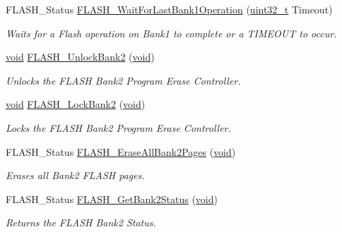 \begin{DoxyCompactItemize}
F\-L\-A\-S\-H\-\_\-\-Status \hyperlink{group___f_l_a_s_h___exported___functions_ga470d345c2ea4304f899aa988bdd23824}{F\-L\-A\-S\-H\-\_\-\-Wait\-For\-Last\-Bank1\-Operation} (\hyperlink{stdint_8h_a435d1572bf3f880d55459d9805097f62}{uint32\-\_\-t} Timeout)
\begin{DoxyCompactList}\small\item\em Waits for a Flash operation on Bank1 to complete or a T\-I\-M\-E\-O\-U\-T to occur. \end{DoxyCompactList}\item 
\hyperlink{group___n_a_m_e_ga18028b8badbf1ea7e704ccac3c488e82}{void} \hyperlink{group___f_l_a_s_h___exported___functions_gadb7b6d3f2dc0cd6153a58a507e123e0e}{F\-L\-A\-S\-H\-\_\-\-Unlock\-Bank2} (\hyperlink{group___n_a_m_e_ga18028b8badbf1ea7e704ccac3c488e82}{void})
\begin{DoxyCompactList}\small\item\em Unlocks the F\-L\-A\-S\-H Bank2 Program Erase Controller. \end{DoxyCompactList}\item 
\hyperlink{group___n_a_m_e_ga18028b8badbf1ea7e704ccac3c488e82}{void} \hyperlink{group___f_l_a_s_h___exported___functions_ga592519cb66d78b0eda7219063de8a163}{F\-L\-A\-S\-H\-\_\-\-Lock\-Bank2} (\hyperlink{group___n_a_m_e_ga18028b8badbf1ea7e704ccac3c488e82}{void})
\begin{DoxyCompactList}\small\item\em Locks the F\-L\-A\-S\-H Bank2 Program Erase Controller. \end{DoxyCompactList}\item 
F\-L\-A\-S\-H\-\_\-\-Status \hyperlink{group___f_l_a_s_h___exported___functions_gad1ac52213328ae0c9ec08666baa7b904}{F\-L\-A\-S\-H\-\_\-\-Erase\-All\-Bank2\-Pages} (\hyperlink{group___n_a_m_e_ga18028b8badbf1ea7e704ccac3c488e82}{void})
\begin{DoxyCompactList}\small\item\em Erases all Bank2 F\-L\-A\-S\-H pages. \end{DoxyCompactList}\item 
F\-L\-A\-S\-H\-\_\-\-Status \hyperlink{group___f_l_a_s_h___exported___functions_ga53c01fc72f37e0d5610f35337a2da110}{F\-L\-A\-S\-H\-\_\-\-Get\-Bank2\-Status} (\hyperlink{group___n_a_m_e_ga18028b8badbf1ea7e704ccac3c488e82}{void})
\begin{DoxyCompactList}\small\item\em Returns the F\-L\-A\-S\-H Bank2 Status. \end{DoxyCompactList}\item 

\end{DoxyCompactItemize}
